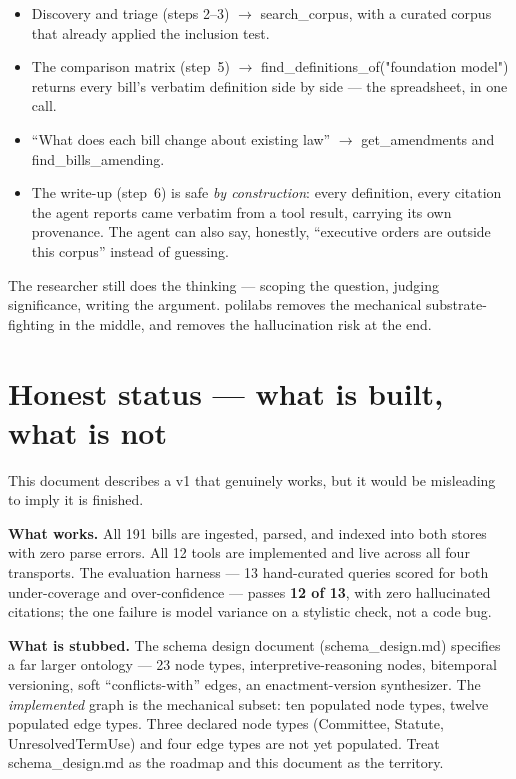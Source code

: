 \documentclass[11pt]{article}
\newcommand{\code}[1]{{\ttfamily\small #1}}
\begin{document}
\begin{itemize}[leftmargin=1.4em,itemsep=2pt]
\item Discovery and triage (steps 2--3) $\rightarrow$ \code{search\_corpus},
  with a curated corpus that already applied the inclusion test.
\item The comparison matrix (step~5) $\rightarrow$
  \code{find\_definitions\_of("foundation model")} returns every bill's
  verbatim definition side by side --- the spreadsheet, in one call.
\item ``What does each bill change about existing law'' $\rightarrow$
  \code{get\_amendments} and \code{find\_bills\_amending}.
\item The write-up (step~6) is safe \emph{by construction}: every definition,
  every citation the agent reports came verbatim from a tool result, carrying
  its own provenance. The agent can also say, honestly, ``executive orders are
  outside this corpus'' instead of guessing.
\end{itemize}

The researcher still does the thinking --- scoping the question, judging
significance, writing the argument. polilabs removes the mechanical
substrate-fighting in the middle, and removes the hallucination risk at the end.

\section{Honest status --- what is built, what is not}

This document describes a v1 that genuinely works, but it would be misleading
to imply it is finished.

\textbf{What works.} All 191 bills are ingested, parsed, and indexed into both
stores with zero parse errors. All 12 tools are implemented and live across all
four transports. The evaluation harness --- 13 hand-curated queries scored for
both under-coverage and over-confidence --- passes \textbf{12 of 13}, with zero
hallucinated citations; the one failure is model variance on a stylistic check,
not a code bug.

\textbf{What is stubbed.} The schema design document (\code{schema\_design.md})
specifies a far larger ontology --- 23 node types, interpretive-reasoning nodes,
bitemporal versioning, soft ``conflicts-with'' edges, an enactment-version
synthesizer. The \emph{implemented} graph is the mechanical subset: ten
populated node types, twelve populated edge types. Three declared node types
(\code{Committee}, \code{Statute}, \code{UnresolvedTermUse}) and four edge types
are not yet populated. Treat \code{schema\_design.md} as the roadmap and this
document as the territory.
\end{document}
